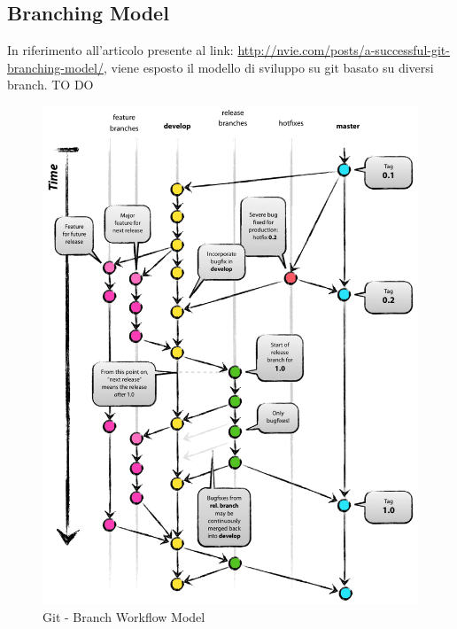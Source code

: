	\subsection{Branching Model} %
	\label{sub:branching_model}
	In riferimento all'articolo presente al link: \newline
	\url{http://nvie.com/posts/a-successful-git-branching-model/}, viene esposto il modello di sviluppo su git basato su diversi branch. \newline
	TO DO
	\begin{figure}[htbp]
		\centering
		\includegraphics[scale=0.4]{images/git_branch_workflow.png}
		\caption{Git - Branch Workflow Model}
		\label{fig:git_branch_workflow_model}
	\end{figure}


\newpage \clearpage